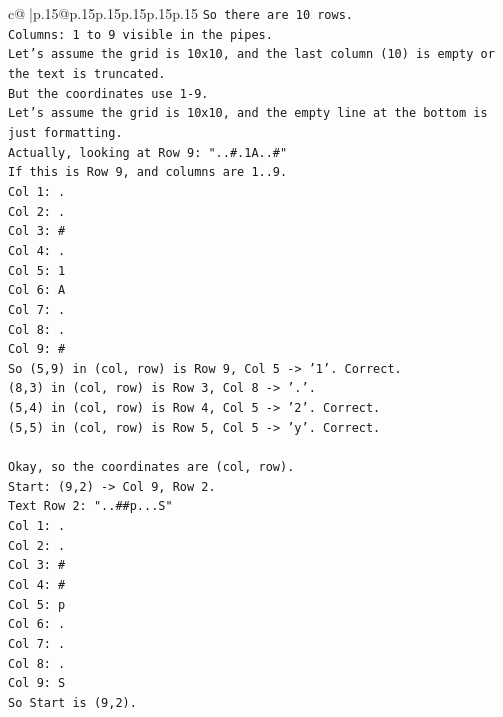 \documentclass{article}
\begin{document}
{\begin{supertabular}{c@{$\;$}|p{.15\linewidth}@{}p{.15\linewidth}p{.15\linewidth}p{.15\linewidth}p{.15\linewidth}p{.15\linewidth}}
{{{\texttt{So there are 10 rows.} \\
\texttt{Columns: 1 to 9 visible in the pipes.} \\
\texttt{Let's assume the grid is 10x10, and the last column (10) is empty or the text is truncated.} \\
\texttt{But the coordinates use 1{-}9.} \\
\texttt{Let's assume the grid is 10x10, and the empty line at the bottom is just formatting.} \\
\texttt{Actually, looking at Row 9: "..\#.1A..\#"} \\
\texttt{If this is Row 9, and columns are 1..9.} \\
\texttt{Col 1: .} \\
\texttt{Col 2: .} \\
\texttt{Col 3: \#} \\
\texttt{Col 4: .} \\
\texttt{Col 5: 1} \\
\texttt{Col 6: A} \\
\texttt{Col 7: .} \\
\texttt{Col 8: .} \\
\texttt{Col 9: \#} \\
\texttt{So (5,9) in (col, row) is Row 9, Col 5 {-}> '1'. Correct.} \\
\texttt{(8,3) in (col, row) is Row 3, Col 8 {-}> '.'.} \\
\texttt{(5,4) in (col, row) is Row 4, Col 5 {-}> '2'. Correct.} \\
\texttt{(5,5) in (col, row) is Row 5, Col 5 {-}> 'y'. Correct.} \\
\\ 
\texttt{Okay, so the coordinates are (col, row).} \\
\texttt{Start: (9,2) {-}> Col 9, Row 2.} \\
\texttt{Text Row 2: "..\#\#p...S"} \\
\texttt{Col 1: .} \\
\texttt{Col 2: .} \\
\texttt{Col 3: \#} \\
\texttt{Col 4: \#} \\
\texttt{Col 5: p} \\
\texttt{Col 6: .} \\
\texttt{Col 7: .} \\
\texttt{Col 8: .} \\
\texttt{Col 9: S} \\
\texttt{So Start is (9,2).} \\
}}}
\end{supertabular}}
\end{document}
